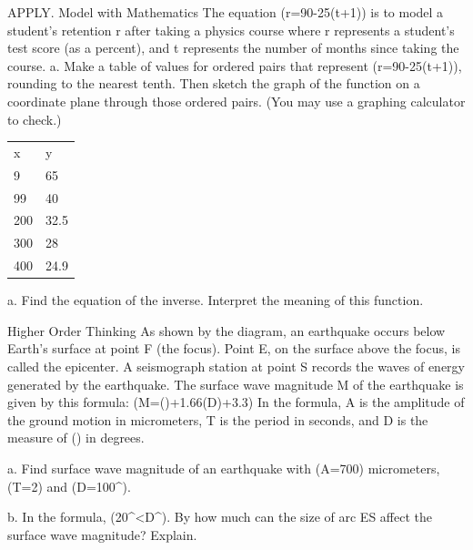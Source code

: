 \documentclass{article}
\newenvironment{practice}[2]{}{}        %
\newcommand{\answer}[1]{}               %
\newcommand{\placeholder}[2]{}          %
\newcommand{\te}[1]{}                   %
\begin{document}
\begin{practice}{29}{2}
APPLY. Model with Mathematics The equation (r=90-25\log(t+1)) is to model a student's retention r after taking a physics course where r represents a student's test score (as a percent), and t represents the number of months since taking the course.
a. Make a table of values for ordered pairs that represent (r=90-25\log(t+1)), rounding to the nearest tenth. Then sketch the graph of the function on a coordinate plane through those ordered pairs. (You may use a graphing calculator to check.)
\answer{Check students' work.}
\begin{tabular}{ll}
x & y \\
9 & 65 \\
99 & 40 \\
200 & 32.5 \\
300 & 28 \\
400 & 24.9 \\
\end{tabular}
\placeholder{graph}{Red decreasing retention curve r=90-25 log(t+1), horizontal axis t, vertical axis r, O; arrowed axes. Grid t=-100 to500 step50 and r=-50 to150 step25, labels t=100,200,300,400 and r=50,100. Curve approaches t=-1 upward, drops steeply near r-axis then levels toward right arrow near (500,22.5); no point markers.}
a. Find the equation of the inverse. Interpret the meaning of this function.
\answer{b. (t=10^{\frac{r-90}{-25}}-1); the number of months since taking the course at which a student has a retention, r}
\te{Printed second part a.; answer key labels it b.}
\end{practice}
\begin{practice}{30}{1}
Higher Order Thinking As shown by the diagram, an earthquake occurs below Earth's surface at point F (the focus). Point E, on the surface above the focus, is called the epicenter. A seismograph station at point S records the waves of energy generated by the earthquake. The surface wave magnitude M of the earthquake is given by this formula:
(M=\log()+1.66(\log D)+3.3)
In the formula, A is the amplitude of the ground motion in micrometers, T is the period in seconds, and D is the measure of () in degrees.
\placeholder{diagram}{Cutaway earth block with green surface and brown subterranean layers, white concentric wave rings around black F labeled Focus. Black E directly above F on surface labeled Epicenter with curved pointer, connected to F vertically. Black S on surface to right, labeled Seismograph Station, connected horizontally to E. Three black arrows radiate from F diagonally up-left, up-right through E, and down-right along fault; surface fault step above focus.}
a. Find surface wave magnitude of an earthquake with (A=700) micrometers, (T=2) and (D=100^\circ).
\answer{magnitude 9.2}
b. In the formula, (20^\circ<D^\circ). By how much can the size of arc ES affect the surface wave magnitude? Explain.
\answer{The size of the arc can add between 2.2 and 3.7 to the surface wave magnitude, meaning the arc size can affect the surface wave magnitude by up to 1.5.}
\end{practice}
\end{document}
